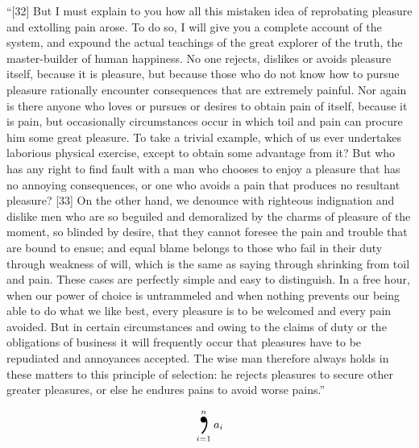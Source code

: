 \documentclass[letterpaper]{article}
\begin{document}
\textdbend
``[32] But I must explain to you how all this mistaken idea of reprobating pleasure and extolling pain arose.
To do so, I will give you a complete account of the system, and expound the actual teachings of the great explorer of the truth, the master-builder of human happiness.
No one rejects, dislikes or avoids pleasure itself, because it is pleasure, but because those who do not know how to pursue pleasure rationally encounter consequences that are extremely painful.
Nor again is there anyone who loves or pursues or desires to obtain pain of itself, because it is pain, but occasionally circumstances occur in which toil and pain can procure him some great pleasure.
To take a trivial example, which of us ever undertakes laborious physical exercise, except to obtain some advantage from it?
But who has any right to find fault with a man who chooses to enjoy a pleasure that has no annoying consequences, or one who avoids a pain that produces no resultant pleasure?
[33] On the other hand, we denounce with righteous indignation and dislike men who are so beguiled and demoralized by the charms of pleasure of the moment, so blinded by desire, that they cannot foresee the pain and trouble that are bound to ensue; and equal blame belongs to those who fail in their duty through weakness of will, which is the same as saying through shrinking from toil and pain.
These cases are perfectly simple and easy to distinguish.
In a free hour, when our power of choice is untrammeled and when nothing prevents our being able to do what we like best, every pleasure is to be welcomed and every pain avoided.
But in certain circumstances and owing to the claims of duty or the obligations of business it will frequently occur that pleasures have to be repudiated and annoyances accepted.
The wise man therefore always holds in these matters to this principle of selection: he rejects pleasures to secure other greater pleasures, or else he endures pains to avoid worse pains.''~\cite{book:lorem_ipsum}\hfill{}

\[
  \bigcomma_{i=1}^n a_{i}
\]

\printbibliography
\end{document}

